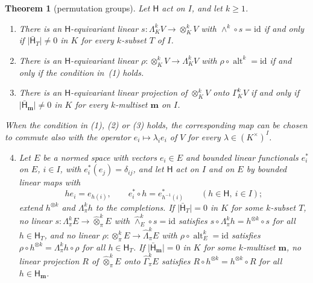 \documentclass[11pt]{amsart}
\newtheorem{theorem}{Theorem}[section]
\theoremstyle{definition}
\theoremstyle{remark}
\numberwithin{equation}{section}
\newcommand{\id}{\mathrm{id}}
\newcommand{\abs}[1]{\lvert #1\rvert}
\theoremstyle{plain}
\theoremstyle{definition}
\theoremstyle{plain}
\begin{document}
\begin{theorem}[permutation groups]\label{can:thm:permutation}
Let $\mathsf H$ act on $I$, and let $k\ge1$.
\begin{enumerate}
\item There is an $\mathsf H$\nobreakdash-equivariant linear $s\colon\Lambda^k_KV\to\otimes^k_KV$ with
$\wedge^k\circ s=\id$ if and only if $\abs{\bar{\mathsf H}_T}\ne0$ in $K$ for every $k$\nobreakdash-subset $T$ of $I$.
\item There is an $\mathsf H$\nobreakdash-equivariant linear $\rho\colon\otimes^k_KV\to\Lambda^k_KV$ with
$\rho\circ\operatorname{alt}^k=\id$ if and only if the condition in~(1) holds.
\item There is an $\mathsf H$\nobreakdash-equivariant linear projection of $\otimes^k_KV$ onto $\Gamma^k_KV$ if and only
if $\abs{\bar{\mathsf H}_{\mathbf m}}\ne0$ in $K$ for every $k$\nobreakdash-multiset $\mathbf m$ on $I$.
\end{enumerate}
When the condition in (1), (2) or (3) holds, the corresponding map can be chosen to commute also with the operator
$e_i\mapsto\lambda_ie_i$ of $V$ for every $\lambda\in(K^\times)^I$.
\begin{enumerate}\setcounter{enumi}{3}
\item Let $E$ be a normed space with vectors $e_i\in E$ and bounded linear functionals $e^*_i$ on $E$, $i\in I$, with
$e^*_i(e_j)=\delta_{ij}$, and let $\mathsf H$ act on $I$ and on $E$ by bounded linear maps with
\begin{equation}\label{can:eq:compatible}
 he_i=e_{h(i)},\qquad e^*_i\circ h=e^*_{h^{-1}(i)}\qquad(h\in\mathsf H,\ i\in I);
\end{equation}
extend $h^{\otimes k}$ and $\Lambda^k_\pi h$ to the completions. If $\abs{\bar{\mathsf H}_T}=0$ in $K$ for some
$k$\nobreakdash-subset $T$, no linear $s\colon\Lambda^k_\pi E\to\widehat\otimes^k_\pi E$ with
$\widehat\wedge^k_E\circ s=\id$ satisfies $s\circ\Lambda^k_\pi h=h^{\otimes k}\circ s$ for all $h\in\mathsf H_T$, and no
linear $\rho\colon\otimes^k_\pi E\to\widehat\Lambda^k_\pi E$ with $\rho\circ\operatorname{alt}^k_E=\id$ satisfies
$\rho\circ h^{\otimes k}=\Lambda^k_\pi h\circ\rho$ for all $h\in\mathsf H_T$. If $\abs{\bar{\mathsf H}_{\mathbf m}}=0$ in
$K$ for some $k$\nobreakdash-multiset $\mathbf m$, no linear projection $R$ of $\widehat\otimes^k_\pi E$ onto
$\widehat\Gamma^k_\pi E$ satisfies $R\circ h^{\otimes k}=h^{\otimes k}\circ R$ for all $h\in\mathsf H_{\mathbf m}$.
\end{enumerate}
\end{theorem}
\end{document}

